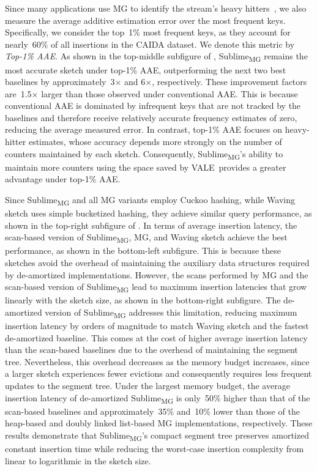\documentclass[sigconf]{acmart}
\newcommand{\sketch}{Sublime}
\newcommand{\sketchmg}{\sketch\textsubscript{MG}\xspace}
\newcommand{\counterencodingabbrv}{VALE}
\begin{document}
Since many applications use MG to identify the stream's heavy hitters~\cite{HeavyGuardian,HeavyKeeper,WavingSketch,NetworkAnomalyDetection1,NetworkAnomalyDetection2}, we also measure the average additive estimation error over the most frequent keys.
Specifically, we consider the top~1\% most frequent keys, as they account for nearly~60\% of all insertions in the \textsc{CAIDA} dataset.
We denote this metric by \emph{Top{\nobreakdash-}1\% AAE}.
As shown in the top-middle subfigure of , \sketchmg remains the most accurate sketch under top{\nobreakdash-}1\% AAE, outperforming the next two best baselines by approximately~3$\times$ and 6$\times$, respectively.
These improvement factors are~1.5$\times$ larger than those observed under conventional AAE.
This is because conventional AAE is dominated by infrequent keys that are not tracked by the baselines and therefore receive relatively accurate frequency estimates of zero, reducing the average measured error.
In contrast, top{\nobreakdash-}1\% AAE focuses on heavy-hitter estimates, whose accuracy depends more strongly on the number of counters maintained by each sketch.
Consequently, \sketchmg's ability to maintain more counters using the space saved by \counterencodingabbrv\ provides a greater advantage under top{\nobreakdash-}1\% AAE.

Since \sketchmg and all MG variants employ Cuckoo hashing, while Waving sketch uses simple bucketized hashing, they achieve similar query performance, as shown in the top-right subfigure of .
In terms of average insertion latency, the scan-based version of \sketchmg, MG, and Waving sketch achieve the best performance, as shown in the bottom-left subfigure.
This is because these sketches avoid the overhead of maintaining the auxiliary data structures required by de-amortized implementations.
However, the scans performed by MG and the scan-based version of \sketchmg lead to maximum insertion latencies that grow linearly with the sketch size, as shown in the bottom-right subfigure.
The de-amortized version of \sketchmg addresses this limitation, reducing maximum insertion latency by orders of magnitude to match Waving sketch and the fastest de-amortized baseline.
This comes at the cost of higher average insertion latency than the scan-based baselines due to the overhead of maintaining the segment tree.
Nevertheless, this overhead decreases as the memory budget increases, since a larger sketch experiences fewer evictions and consequently requires less frequent updates to the segment tree.
Under the largest memory budget, the average insertion latency of de-amortized \sketchmg is only~50\% higher than that of the scan-based baselines and approximately~35\% and~10\% lower than those of the heap-based and doubly linked list-based MG implementations, respectively.
These results demonstrate that \sketchmg's compact segment tree preserves amortized constant insertion time while reducing the worst-case insertion complexity from linear to logarithmic in the sketch size.
\end{document}
